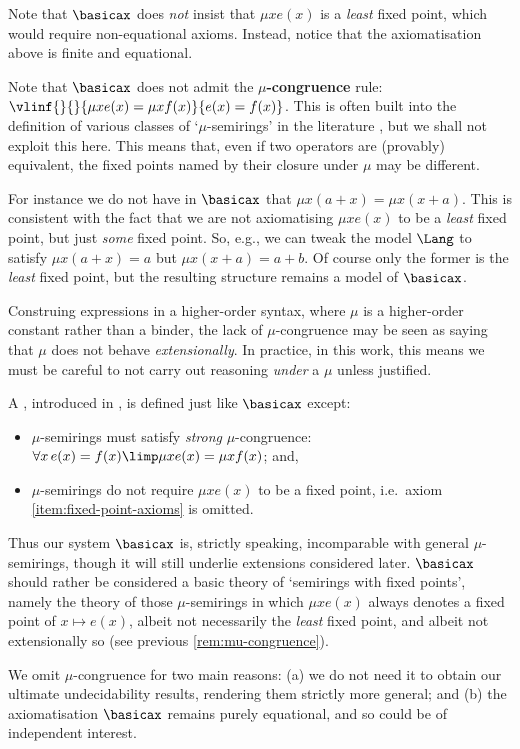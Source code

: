 \documentclass[runningheads]{amsart}
\begin{document}
Note that $\basicax$ does \emph{not} insist that $\mu x e(x)$ is a \emph{least} fixed point, which would require non-equational axioms. 
Instead, notice that the axiomatisation above is finite and equational.


\begin{remark}
    [On $\mu$-congruence]
    \label{rem:mu-congruence}
    Note that $\basicax$ does not admit the \textbf{$\mu$-congruence} rule: $\vlinf{}{}{\mu x e(x) = \mu x f(x)}{e(x) = f(x)}$.
    This is often built into the definition of various classes of `$\mu$-semirings' in the literature \cite{EsikLeiss05,GHK13,Leiss16}, but we shall not exploit this here.
    This means that, even if two operators are (provably) equivalent, the fixed points named by their closure under $\mu$ may be different. 
    
    For instance we do not have in $\basicax$ that $\mu x (a+x) = \mu x (x+a)$.
    This is consistent with the fact that we are not axiomatising $\mu x e(x)$ to be a \emph{least} fixed point, but just \emph{some} fixed point.
    So, e.g., we can tweak the model $\Lang$ to satisfy $\mu x (a+x) =a $ but $\mu x (x+a) = a+b$.
    Of course only the former is the \emph{least} fixed point, but the resulting structure remains a model of $\basicax$.

    Construing expressions in a higher-order syntax, where $\mu$ is a higher-order constant rather than a binder, the lack of $\mu$-congruence may be seen as saying that $\mu$ does not behave \emph{extensionally}.
    In practice, in this work, this means we must be careful to not carry out reasoning \emph{under} a $\mu$ unless justified.
\end{remark}

\begin{remark}
    A , introduced in \cite{EsikLeiss05}, is defined just like $\basicax$ except:
    \begin{itemize}
        \item $\mu$-semirings must satisfy \emph{strong} $\mu$-congruence:
        $\forall x\,  e(x) = f(x) \limp \mu x e(x) = \mu x f(x)$; and,
        \item $\mu$-semirings do not require $\mu x e(x) $ to be a fixed point, i.e.\ axiom \eqref{item:fixed-point-axioms} is omitted.
    \end{itemize}
    Thus our system $\basicax$ is, strictly speaking, incomparable with general $\mu$-semirings, though it will still underlie extensions considered later.
     $\basicax$ should rather be considered a basic theory of `semirings with fixed points', namely the theory of those $\mu$-semirings in which $\mu x e(x)$ always denotes a fixed point of $x \mapsto e(x)$, albeit not necessarily the \emph{least} fixed point, and albeit not extensionally so (see previous \cref{rem:mu-congruence}).

% 
     We omit $\mu$-congruence for two main reasons: (a) we do not need it to obtain our ultimate undecidability results, rendering them strictly more general; and (b) the axiomatisation $\basicax$ remains purely equational, and so could be of independent interest.
\end{remark}
\end{document}

